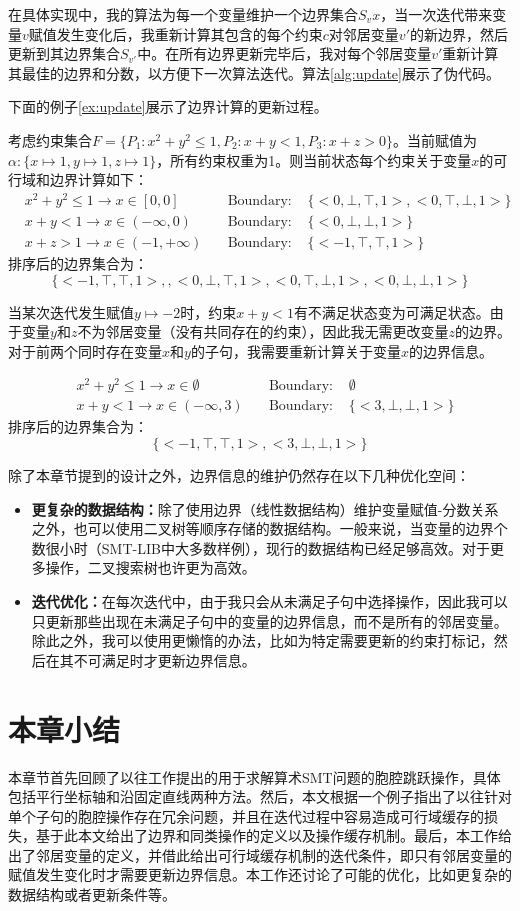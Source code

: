 在具体实现中，我的算法为每一个变量维护一个边界集合$S_vx$，当一次迭代带来变量$v$赋值发生变化后，我重新计算其包含的每个约束$c$对邻居变量$v'$的新边界，然后更新到其边界集合$S_{v'}$中。在所有边界更新完毕后，我对每个邻居变量$v'$重新计算其最佳的边界和分数，以方便下一次算法迭代。算法\ref{alg:update}展示了伪代码。

下面的例子\ref{ex:update}展示了边界计算的更新过程。

\begin{example}
\label{ex:update}
考虑约束集合$F = \{P_1: x^2 + y^2 \leq 1, P_2: x + y < 1, P_3: x + z > 0\}$。当前赋值为$\alpha: \{x \mapsto 1, y \mapsto 1, z \mapsto 1\}$，所有约束权重为1。则当前状态每个约束关于变量$x$的可行域和边界计算如下：
\begin{align}
& x^2 + y^2 \leq 1  \rightarrow x \in [0, 0] \nonumber & \quad \text{Boundary: } & \{<0, \bot, \top, 1>, <0, \top, \bot, 1>\} \nonumber \\
& x + y < 1  \rightarrow x \in (-\infty, 0) \nonumber & \quad \text{Boundary: } & \{<0, \bot, \bot, 1>\} \nonumber \\
& x + z > 1  \rightarrow x \in (-1, +\infty) \nonumber & \quad \text{Boundary: } & \{<-1, \top, \top, 1>\} \nonumber
\end{align}
排序后的边界集合为：
$$
\{<-1, \top, \top, 1>, , <0, \bot, \top, 1>, <0, \top, \bot, 1>, <0, \bot, \bot, 1>\}
$$

当某次迭代发生赋值$y \mapsto -2$时，约束$x + y < 1$有不满足状态变为可满足状态。由于变量$y$和$z$不为邻居变量（没有共同存在的约束），因此我无需更改变量$z$的边界。对于前两个同时存在变量$x$和$y$的子句，我需要重新计算关于变量$x$的边界信息。

\begin{align}
& x^2 + y^2 \leq 1  \rightarrow x \in \emptyset \nonumber & \quad \text{Boundary: } & \emptyset \nonumber \\
& x + y < 1  \rightarrow x \in (-\infty, 3) \nonumber & \quad \text{Boundary: } & \{<3, \bot, \bot, 1>\} \nonumber
\end{align}
排序后的边界集合为：
$$
\{<-1, \top, \top, 1>, <3, \bot, \bot, 1>\}
$$
\end{example}

除了本章节提到的设计之外，边界信息的维护仍然存在以下几种优化空间：
\begin{itemize}
    \item \textbf{更复杂的数据结构：}除了使用边界（线性数据结构）维护变量赋值-分数关系之外，也可以使用二叉树等顺序存储的数据结构。一般来说，当变量的边界个数很小时（SMT-LIB中大多数样例），现行的数据结构已经足够高效。对于更多操作，二叉搜索树也许更为高效。
    \item \textbf{迭代优化：}在每次迭代中，由于我只会从未满足子句中选择操作，因此我可以只更新那些出现在未满足子句中的变量的边界信息，而不是所有的邻居变量。除此之外，我可以使用更懒惰的办法，比如为特定需要更新的约束打标记，然后在其不可满足时才更新边界信息。
\end{itemize}

\section{本章小结}
本章节首先回顾了以往工作提出的用于求解算术SMT问题的胞腔跳跃操作，具体包括平行坐标轴和沿固定直线两种方法。然后，本文根据一个例子指出了以往针对单个子句的胞腔操作存在冗余问题，并且在迭代过程中容易造成可行域缓存的损失，基于此本文给出了边界和同类操作的定义以及操作缓存机制。最后，本工作给出了邻居变量的定义，并借此给出可行域缓存机制的迭代条件，即只有邻居变量的赋值发生变化时才需要更新边界信息。本工作还讨论了可能的优化，比如更复杂的数据结构或者更新条件等。